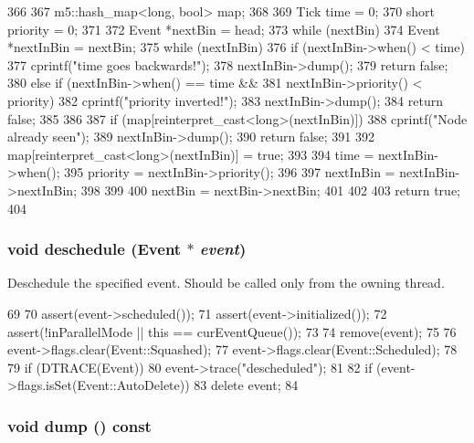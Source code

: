 \begin{DoxyCode}
366 {
367     m5::hash_map<long, bool> map;
368 
369     Tick time = 0;
370     short priority = 0;
371 
372     Event *nextBin = head;
373     while (nextBin) {
374         Event *nextInBin = nextBin;
375         while (nextInBin) {
376             if (nextInBin->when() < time) {
377                 cprintf("time goes backwards!");
378                 nextInBin->dump();
379                 return false;
380             } else if (nextInBin->when() == time &&
381                        nextInBin->priority() < priority) {
382                 cprintf("priority inverted!");
383                 nextInBin->dump();
384                 return false;
385             }
386 
387             if (map[reinterpret_cast<long>(nextInBin)]) {
388                 cprintf("Node already seen");
389                 nextInBin->dump();
390                 return false;
391             }
392             map[reinterpret_cast<long>(nextInBin)] = true;
393 
394             time = nextInBin->when();
395             priority = nextInBin->priority();
396 
397             nextInBin = nextInBin->nextInBin;
398         }
399 
400         nextBin = nextBin->nextBin;
401     }
402 
403     return true;
404 }
\end{DoxyCode}
\hypertarget{classEventQueue_ab1b8fc2b2605fdc1d88bf07a86e1fe07}{
\subsubsection[{deschedule}]{\setlength{\rightskip}{0pt plus 5cm}void deschedule ({\bf Event} $\ast$ {\em event})}}
\label{classEventQueue_ab1b8fc2b2605fdc1d88bf07a86e1fe07}
Deschedule the specified event. Should be called only from the owning thread. 


\begin{DoxyCode}
69 {
70     assert(event->scheduled());
71     assert(event->initialized());
72     assert(!inParallelMode || this == curEventQueue());
73 
74     remove(event);
75 
76     event->flags.clear(Event::Squashed);
77     event->flags.clear(Event::Scheduled);
78 
79     if (DTRACE(Event))
80         event->trace("descheduled");
81 
82     if (event->flags.isSet(Event::AutoDelete))
83         delete event;
84 }
\end{DoxyCode}
\hypertarget{classEventQueue_a4a4fecb6d7cd9d0b8eb6579eee183af8}{
\subsubsection[{dump}]{\setlength{\rightskip}{0pt plus 5cm}void dump () const}}
\label{classEventQueue_a4a4fecb6d7cd9d0b8eb6579eee183af8}



